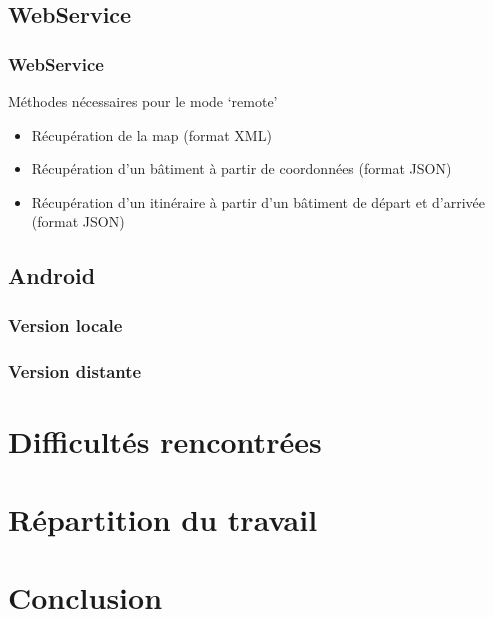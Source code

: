 \documentclass{beamer}
\begin{document}
\subsection{WebService}
\begin{frame}
\frametitle{WebService}
\begin{block}{Méthodes nécessaires pour le mode `remote'}
\begin{itemize}
\item Récupération de la map (format XML)
\item Récupération d'un bâtiment à partir de coordonnées (format JSON)
\item Récupération d'un itinéraire à partir d'un bâtiment de départ et d'arrivée (format JSON)
\end{itemize}
\end{block}
\end{frame}

\subsection{Android}
\subsubsection{Version locale}
\begin{frame}
\end{frame}
\subsubsection{Version distante}
\begin{frame}
\end{frame}


\section{Difficultés rencontrées}
\begin{frame}
\end{frame}


\section{Répartition du travail}
\begin{frame}
\end{frame}


\section{Conclusion}
\begin{frame}
\end{frame}
\end{document}

